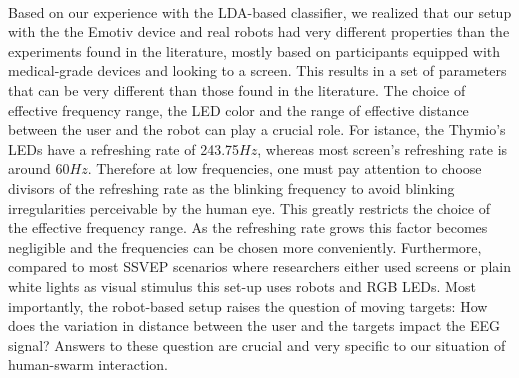 \documentclass{svmult}
\begin{document}
\\
Based on our experience with the LDA-based classifier, we realized that our setup with the the Emotiv device and real robots had very different properties than the experiments found in the literature, mostly based on participants equipped with medical-grade devices and looking to a screen. This results in a set of parameters that can be very different than those found in the literature. 
The choice of effective frequency range, the LED color and the range of effective distance between the user and the robot can play a crucial role. 
For istance, the Thymio's LEDs have a refreshing rate of 243.75$Hz$, whereas most screen's refreshing rate is around 60$Hz$. Therefore at low frequencies, one must pay attention to choose divisors of the refreshing rate as the blinking frequency to avoid blinking irregularities perceivable by the human eye. This greatly restricts the choice of the effective frequency range. As the refreshing rate grows this factor becomes negligible and the frequencies can be chosen more conveniently. Furthermore, compared to most SSVEP scenarios where researchers either used screens or plain white lights as visual stimulus this set-up uses robots and RGB LEDs. Most importantly, the robot-based setup raises the question of moving targets: How does the variation in distance between the user and the targets impact the EEG signal? Answers to these question are crucial and very specific to our situation of human-swarm interaction.
\end{document}
